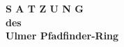 \begin{titlepage}
    \vspace*{\fill}
    \begin{center}
        \begin{Huge}
            \textbf{
                S A T Z U N G\\
                \vspace{20pt}
                des\\ 
                \vspace{20pt}
                Ulmer Pfadfinder-Ring\\
            }
        \end{Huge}
    \end{center}
    \vspace{150pt}
    \vspace*{\fill}
\end{titlepage}
